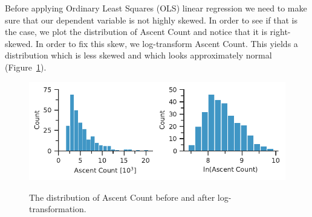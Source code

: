 \documentclass[11pt,a4paper]{article}
\begin{document}
Before applying Ordinary Least Squares (OLS) linear regression we need to make sure that our dependent variable is not highly skewed. In order to see if that is the case, we plot the distribution of Ascent Count and notice that it is right-skewed. In order to fix this skew, we log-transform Ascent Count. This yields a distribution which is less skewed and which looks approximately normal (Figure~\ref{fds-project-template:fig:ascent_count_distribution}).
\begin{figure} [h!]
  \centering
  \includegraphics{report/ascent_count_distribution.pdf}
  \begin{minipage}[t]{.5\linewidth}
        \centering
        \label{fds-project-template:fig:box_dist_ascents}
    \end{minipage}%
    \begin{minipage}[t]{.5\linewidth}
        \centering
        \label{fds-project-template:fig:box_dist_altitude}
    \end{minipage}
  \caption{The distribution of Ascent Count before and after log-transformation.}
  \label{fds-project-template:fig:ascent_count_distribution}
\end{figure}
\end{document}
